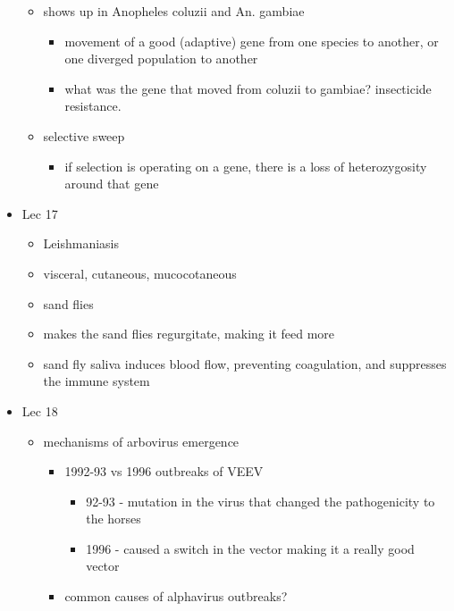 \documentclass{article}
\begin{document}
\begin{itemize}
\begin{itemize}
            \item shows up in Anopheles coluzii and An. gambiae
            \begin{itemize}
                \item movement of a good (adaptive) gene from one species to another, or one diverged population to another
                \item what was the gene that moved from coluzii to gambiae?  insecticide resistance.
            \end{itemize}
            \item selective sweep
            \begin{itemize}
                \item if selection is operating on a gene, there is a loss of heterozygosity around that gene
            \end{itemize}
        \end{itemize}
        \item Lec 17
        \begin{itemize}
            \item Leishmaniasis
            \item visceral, cutaneous, mucocotaneous
            \item sand flies
            \item makes the sand flies regurgitate, making it feed more
            \item sand fly saliva induces blood flow, preventing coagulation, and suppresses the immune system
        \end{itemize}
        \item Lec 18
        \begin{itemize}
            \item mechanisms of arbovirus emergence
            \begin{itemize}
                \item 1992-93 vs 1996 outbreaks of VEEV
                \begin{itemize}
                    \item 92-93 - mutation in the virus that changed the pathogenicity to the horses
                    \item 1996 - caused a switch in the vector making it a really good vector
                \end{itemize}
                \item common causes of alphavirus outbreaks?
                \begin{itemize}

\end{itemize}
\end{itemize}
\end{itemize}
\end{itemize}
\end{document}

